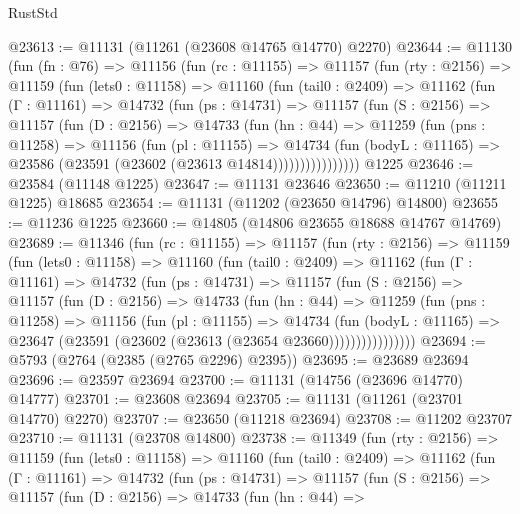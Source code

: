 \begin{lexlean}{RustStd}
\begin{coremodule}
@23613 := @11131 (@11261 (@23608 @14765 @14770) @2270)
@23644 := @11130
    (fun (fn : @76) =>
    @11156
      (fun (rc : @11155) =>
      @11157
        (fun (rty : @2156) =>
        @11159
          (fun (lets0 : @11158) =>
          @11160
            (fun (tail0 : @2409) =>
            @11162
              (fun (Γ : @11161) =>
              @14732
                (fun (ps : @14731) =>
                @11157
                  (fun (S : @2156) =>
                  @11157
                    (fun (D : @2156) =>
                    @14733
                      (fun (hn : @44) =>
                      @11259
                        (fun (pns : @11258) =>
                        @11156
                          (fun (pl : @11155) =>
                          @14734
                            (fun (bodyL : @11165) =>
                            @23586 (@23591 (@23602 (@23613 @14814))))))))))))))))
    @1225
@23646 := @23584 (@11148 @1225)
@23647 := @11131 @23646
@23650 := @11210 (@11211 @1225) @18685
@23654 := @11131 (@11202 (@23650 @14796) @14800)
@23655 := @11236 @1225
@23660 := @14805 (@14806 @23655 @18688 @14767 @14769)
@23689 := @11346
    (fun (rc : @11155) =>
    @11157
      (fun (rty : @2156) =>
      @11159
        (fun (lets0 : @11158) =>
        @11160
          (fun (tail0 : @2409) =>
          @11162
            (fun (Γ : @11161) =>
            @14732
              (fun (ps : @14731) =>
              @11157
                (fun (S : @2156) =>
                @11157
                  (fun (D : @2156) =>
                  @14733
                    (fun (hn : @44) =>
                    @11259
                      (fun (pns : @11258) =>
                      @11156
                        (fun (pl : @11155) =>
                        @14734
                          (fun (bodyL : @11165) =>
                          @23647 (@23591 (@23602 (@23613 (@23654 @23660))))))))))))))))
@23694 := @5793 (@2764 (@2385 (@2765 @2296) @2395))
@23695 := @23689 @23694
@23696 := @23597 @23694
@23700 := @11131 (@14756 (@23696 @14770) @14777)
@23701 := @23608 @23694
@23705 := @11131 (@11261 (@23701 @14770) @2270)
@23707 := @23650 (@11218 @23694)
@23708 := @11202 @23707
@23710 := @11131 (@23708 @14800)
@23738 := @11349
    (fun (rty : @2156) =>
    @11159
      (fun (lets0 : @11158) =>
      @11160
        (fun (tail0 : @2409) =>
        @11162
          (fun (Γ : @11161) =>
          @14732
            (fun (ps : @14731) =>
            @11157
              (fun (S : @2156) =>
              @11157
                (fun (D : @2156) =>
                @14733
                  (fun (hn : @44) =>

\end{coremodule}
\end{lexlean}
